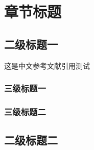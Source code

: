 \chapter{章节标题}
\section{二级标题一}
这是中文参考文献引用测试\cite{HBGY202406012}

\subsection{三级标题一}
\subsection{三级标题二}
\section{二级标题二}